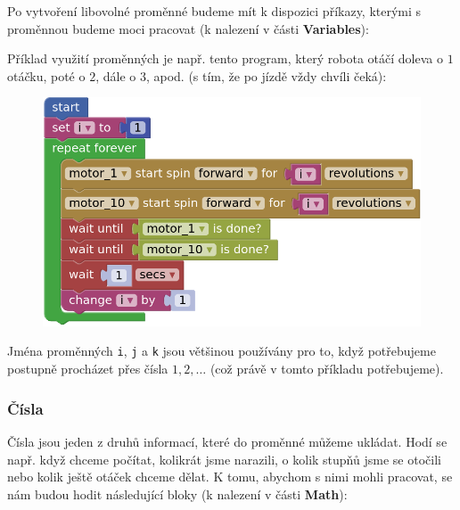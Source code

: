\documentclass[../main.tex]{subfiles}
\begin{document}
	Po vytvoření libovolné proměnné budeme mít k dispozici příkazy, kterými s proměnnou budeme moci pracovat (k nalezení v části \textbf{Variables}):
	\begin{itemize}
		\blockVariableChange
		\blockVariableGet
		\blockVariableSet
	\end{itemize}

	 Příklad využití proměnných je např. tento program, který robota otáčí doleva o $1$ otáčku, poté o $2$, dále o $3$, apod. (s tím, že po jízdě vždy chvíli čeká):

	\begin{figure}[h!]%
		\centering
		\begin{minipage}{0.5\textwidth}
			\includegraphics[width=\linewidth]{Images/05/variable-program.png}
		\end{minipage}
	\end{figure}

	Jména proměnných \texttt{i}, \texttt{j} a \texttt{k} jsou většinou používány pro to, když potřebujeme postupně procházet přes čísla $1, 2, \ldots$ (což právě v tomto příkladu potřebujeme).

	\subsubsection{Čísla}
	Čísla jsou jeden z druhů informací, které do proměnné můžeme ukládat. Hodí se např. když chceme počítat, kolikrát jsme narazili, o kolik stupňů jsme se otočili nebo kolik ještě otáček chceme dělat. K tomu, abychom s nimi mohli pracovat, se nám budou hodit následující bloky (k nalezení v části \textbf{Math}):
  
	\begin{itemize}
		\blockMathOperation
		\blockMathTest
		\blockMathValue
		\blockMathConstant
		\blockMathRandom
	\end{itemize}
\end{document}
